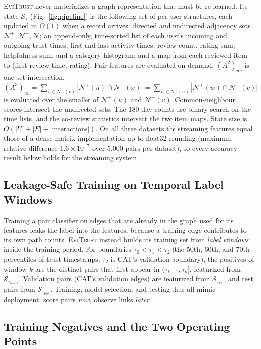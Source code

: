 \documentclass[conference]{IEEEtran}
\newcommand{\evi}{\textsc{EviTrust}}
\begin{document}
\evi{} never materializes a graph representation that must be re-learned. Its state $\mathcal{S}_\tau$ (Fig.~\ref{fig:pipeline}) is the following set of per-user structures, each updated in $O(1)$ when a record arrives:
directed and undirected adjacency sets $\mathcal{N}^{+},\mathcal{N}^{-},\mathcal{N}$;
an append-only, time-sorted list of each user's incoming and outgoing trust times;
first and last activity times;
review count, rating sum, helpfulness sum, and a category histogram;
and a map from each reviewed item to (first review time, rating).
Pair features are evaluated on demand. $(A^2)_{uv}$ is one set intersection. $(A^3)_{uv}=\sum_{x\in\mathcal{N}^{-}(v)}|\mathcal{N}^{+}(u)\cap\mathcal{N}^{-}(x)|=\sum_{w\in\mathcal{N}^{+}(u)}|\mathcal{N}^{+}(w)\cap\mathcal{N}^{-}(v)|$ is evaluated over the smaller of $\mathcal{N}^{+}(u)$ and $\mathcal{N}^{-}(v)$. Common-neighbour scores intersect the undirected sets. The 180-day counts use binary search on the time lists, and the co-review statistics intersect the two item maps.
State size is $O(|U|+|E|+|\text{interactions}|)$. On all three datasets the streaming features equal those of a dense matrix implementation up to float32 rounding (maximum relative difference $1.6\times10^{-7}$ over 5{,}000 pairs per dataset), so every accuracy result below holds for the streaming system.

\subsection{Leakage-Safe Training on Temporal Label Windows}

Training a pair classifier on edges that are already in the graph used for its features leaks the label into the features, because a training edge contributes to its own path counts. \evi{} instead builds its training set from \emph{label windows} inside the training period. For boundaries $\tau_0<\tau_1<\tau_2$ (the 50th, 60th, and 70th percentiles of trust timestamps; $\tau_2$ is CAT's validation boundary), the positives of window $k$ are the distinct pairs that first appear in $(\tau_{k-1},\tau_k]$, featurized from $\mathcal{S}_{\tau_{k-1}}$. Validation pairs (CAT's validation edges) are featurized from $\mathcal{S}_{\tau_{\text{val}}}$, and test pairs from $\mathcal{S}_{\tau_{\text{test}}}$. Training, model selection, and testing thus all mimic deployment: score pairs \emph{now}, observe links \emph{later}.

\subsection{Training Negatives and the Two Operating Points}
\end{document}
